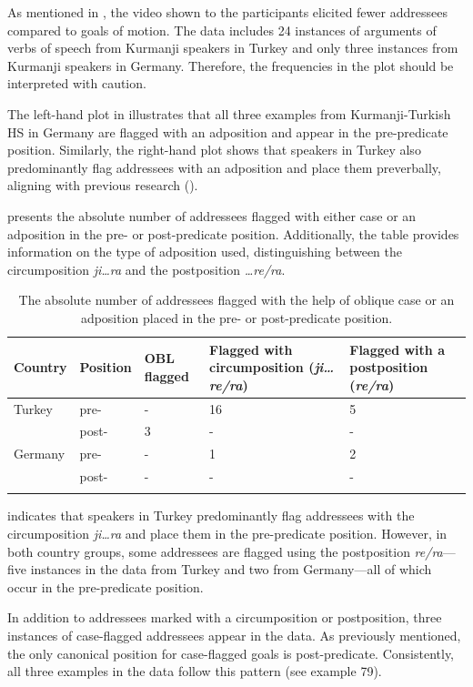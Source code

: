 As mentioned in , the video shown to the participants elicited fewer addressees compared to goals of motion. The data includes 24 instances of arguments of verbs of speech from Kurmanji speakers in Turkey and only three instances from Kurmanji speakers in Germany. Therefore, the frequencies in the plot should be interpreted with caution.

The left-hand plot in  illustrates that all three examples from Kurmanji-Turkish HS in Germany are flagged with an adposition and appear in the pre-predicate position. Similarly, the right-hand plot shows that speakers in Turkey also predominantly flag addressees with an adposition and place them preverbally, aligning with previous research (\citealt{Gundogdu2019, Haig2022}).

 presents the absolute number of addressees flagged with either case or an adposition in the pre- or post-predicate position. Additionally, the table provides information on the type of adposition used, distinguishing between the circumposition \textit{ji…ra} and the postposition \textit{…re/ra}.

\begin{table}
\begin{tabularx}{\textwidth}{llYYY}
\lsptoprule
Country & Position & OBL flagged & Flagged with circumposition
(\textit{ji…re/ra}) & Flagged with a postposition (\textit{re/ra})\\
\midrule
Turkey & pre- & - & 16 & 5\\
& post- & 3 & - & -\\
Germany & pre- & - & 1 & 2\\
& post- & - & - & -\\
\lspbottomrule
\end{tabularx}
\caption{\label{tab:key:17} The absolute number of addressees flagged with the help of oblique case or an adposition placed in the pre- or post-predicate position.}
\end{table}

 indicates that speakers in Turkey predominantly flag addressees with the circumposition \textit{ji…ra} and place them in the pre-predicate position. However, in both country groups, some addressees are flagged using the postposition \textit{re/ra}—five instances in the data from Turkey and two from Germany—all of which occur in the pre-predicate position.

In addition to addressees marked with a circumposition or postposition, three instances of case-flagged addressees appear in the data. As previously mentioned, the only canonical position for case-flagged goals is post-predicate. Consistently, all three examples in the data follow this pattern (see example 79).


